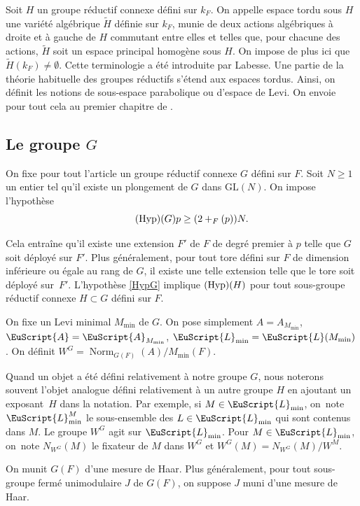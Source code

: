 \documentclass[JEP,XML,SOM,Unicode,francais]{cedram}
\let\mathcal \EuScript
\newcommand{\NoChangel}[1]{%
\expandafter\let\csname old\string#1\endcsname=#1
\let#1=\relax
\newcommand{#1}{\mathcode`l="716C\csname old\string#1\endcsname\mathcode`l="7160 }%
}
\newcommand{\Hyp}{\textup{Hyp}}
\DeclareMathOperator{\Norm}{Norm}
\DeclareMathOperator{\val}{val} \NoChangel{\val}
\newcommand{\cA}{\mathcal{A}}
\newcommand{\cL}{\mathcal{L}}
\theoremstyle{plain}
\theoremstyle{definition}
\begin{document}
Soit $H$ un groupe réductif connexe défini sur $k_{F}$. On appelle espace tordu sous $H$ une variété algébrique $\tilde{H}$ définie sur $k_{F}$, munie de deux actions algébriques à droite et à gauche de $H$ commutant entre elles et telles que, pour chacune des actions, $\tilde{H}$ soit un espace principal homogène sous $H$. On impose de plus ici que $\tilde{H}(k_{F})\neq\emptyset$. Cette terminologie a été introduite par Labesse. Une partie de la théorie habituelle des groupes réductifs s'étend aux espaces tordus. Ainsi, on définit les notions de sous-espace parabolique ou d'espace de Levi. On envoie pour tout cela au premier chapitre de \cite{MW}.

\subsection{Le groupe \texorpdfstring{$G$}{G}}\label{legroupeG}

On fixe pour tout l'article un groupe réductif connexe $G$ défini sur $F$. Soit $N\geq1$ un entier tel qu'il existe un plongement de $G$ dans $\mathrm{GL}(N)$.
On impose l'hypothèse
\begin{equation}\tag*{$\textup{(\Hyp)}(G)$}\label{HypG}
p\geq (2+\val_{F}(p))N.
\end{equation}

Cela
entraîne qu'il existe une extension $F'$ de $F$ de degré premier à $p$ telle que $G$ soit déployé sur $F'$. Plus généralement, pour tout tore défini sur $F$ de dimension inférieure ou égale au rang de $G$, il existe une telle extension telle que le tore soit déployé sur~$F'$. L'hypothèse \ref{HypG} implique $(\Hyp)(H)$ pour tout sous-groupe réductif connexe $H\subset G$ défini sur $F$.

On fixe un Levi minimal $M_{\min}$ de $G$. On pose simplement $A=A_{M_{\min}}$, $\cA=\cA_{M_{\min}}$, $\cL_{\min}=\cL(M_{\min})$. On définit $W^G=\Norm_{G(F)}(A)/M_{\min}(F)$.

Quand un objet a été défini relativement à notre groupe $G$, nous noterons souvent l'objet analogue défini relativement à un autre groupe $H$ en ajoutant un exposant~$H$ dans la notation. Par exemple, si $M\in \cL_{\min}$, on~note $\cL_{\min}^M$ le sous-ensemble des $L\in \cL_{\min}$ qui sont contenus dans $M$. Le groupe $W^G$ agit sur $\cL_{\min}$.
Pour $M\in \cL_{\min}$, on~note $N_{W^G}(M)$ le fixateur de $M$ dans $W^G$ et $W^G(M)=N_{W^G}(M)/W^M$.

On munit $G(F)$ d'une mesure de Haar. Plus généralement, pour tout sous-groupe fermé unimodulaire $J$ de $G(F)$, on suppose $J$ muni d'une mesure de Haar.
\end{document}
